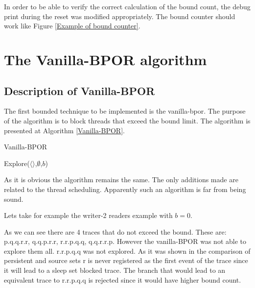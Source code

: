 In order to be able to verify the correct calculation of the bound count, the debug print during the reset was modified appropriately.
The bound counter should work like Figure \ref{Example of bound counter}.


\section{The Vanilla-BPOR algorithm}


\subsection{Description of Vanilla-BPOR}
The first bounded technique to be implemented is the vanilla-bpor. The purpose of the algorithm is to block threads that exceed the bound
limit. The algorithm is presented at Algorithm \ref{Vanilla-BPOR}.

\begin{algorithm}
    \caption{Vanilla-BPOR}
    \label{Vanilla-BPOR}
    Explore($\langle \rangle$,$\emptyset$,$b$)\;
\end{algorithm}

As it is obvious the algorithm remains the same. The only additions made are related to the thread scheduling.
Apparently such an algorithm is far from being sound. 

Lets take for example the writer-2 readers example with $b=0$. 


As we can see there are 4 traces that do not exceed the bound. These are:
p.q.q.r.r, q.q.p.r.r, r.r.p.q.q, q.q.r.r.p.
However the vanilla-BPOR was not able to explore them all. r.r.p.q.q was not explored.
As it was shown in the comparison of persistent and source sets r is never registered as the first event of the trace
since it will lead to a sleep set blocked trace. The branch that would lead to an equivalent trace to r.r.p.q.q is rejected
since it would have higher bound count.

